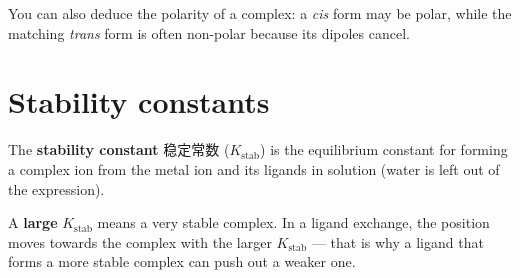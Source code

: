 \documentclass[11pt]{article}
\begin{document}
You can also deduce the polarity of a complex: a \emph{cis} form may be polar, while the matching \emph{trans} form is often non-polar because its dipoles cancel.

\section*{Stability constants}

The \textbf{stability constant} 稳定常数 ($K_{\text{stab}}$) is the equilibrium constant for forming a complex ion from the metal ion and its ligands in solution (water is left out of the expression).

A \textbf{large} $K_{\text{stab}}$ means a very stable complex. In a ligand exchange, the position moves towards the complex with the larger $K_{\text{stab}}$ — that is why a ligand that forms a more stable complex can push out a weaker one.
\end{document}
